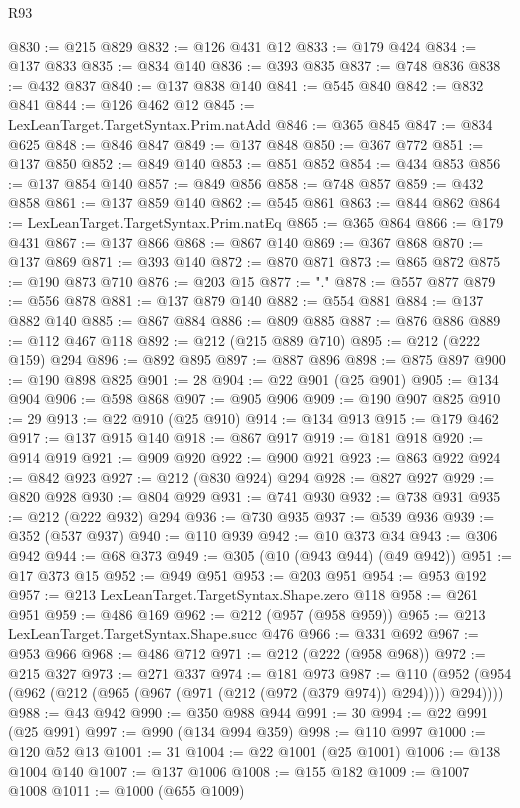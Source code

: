 \begin{lexlean}{R93}
\begin{coremodule}
@830 := @215 @829
@832 := @126 @431 @12
@833 := @179 @424
@834 := @137 @833
@835 := @834 @140
@836 := @393 @835
@837 := @748 @836
@838 := @432 @837
@840 := @137 @838 @140
@841 := @545 @840
@842 := @832 @841
@844 := @126 @462 @12
@845 := LexLeanTarget.TargetSyntax.Prim.natAdd
@846 := @365 @845
@847 := @834 @625
@848 := @846 @847
@849 := @137 @848
@850 := @367 @772
@851 := @137 @850
@852 := @849 @140
@853 := @851 @852
@854 := @434 @853
@856 := @137 @854 @140
@857 := @849 @856
@858 := @748 @857
@859 := @432 @858
@861 := @137 @859 @140
@862 := @545 @861
@863 := @844 @862
@864 := LexLeanTarget.TargetSyntax.Prim.natEq
@865 := @365 @864
@866 := @179 @431
@867 := @137 @866
@868 := @867 @140
@869 := @367 @868
@870 := @137 @869
@871 := @393 @140
@872 := @870 @871
@873 := @865 @872
@875 := @190 @873 @710
@876 := @203 @15
@877 := "."
@878 := @557 @877
@879 := @556 @878
@881 := @137 @879 @140
@882 := @554 @881
@884 := @137 @882 @140
@885 := @867 @884
@886 := @809 @885
@887 := @876 @886
@889 := @112 @467 @118
@892 := @212 (@215 @889 @710)
@895 := @212 (@222 @159) @294
@896 := @892 @895
@897 := @887 @896
@898 := @875 @897
@900 := @190 @898 @825
@901 := 28
@904 := @22 @901 (@25 @901)
@905 := @134 @904
@906 := @598 @868
@907 := @905 @906
@909 := @190 @907 @825
@910 := 29
@913 := @22 @910 (@25 @910)
@914 := @134 @913
@915 := @179 @462
@917 := @137 @915 @140
@918 := @867 @917
@919 := @181 @918
@920 := @914 @919
@921 := @909 @920
@922 := @900 @921
@923 := @863 @922
@924 := @842 @923
@927 := @212 (@830 @924) @294
@928 := @827 @927
@929 := @820 @928
@930 := @804 @929
@931 := @741 @930
@932 := @738 @931
@935 := @212 (@222 @932) @294
@936 := @730 @935
@937 := @539 @936
@939 := @352 (@537 @937)
@940 := @110 @939
@942 := @10 @373 @34
@943 := @306 @942
@944 := @68 @373
@949 := @305 (@10 (@943 @944) (@49 @942))
@951 := @17 @373 @15
@952 := @949 @951
@953 := @203 @951
@954 := @953 @192
@957 := @213 LexLeanTarget.TargetSyntax.Shape.zero @118
@958 := @261 @951
@959 := @486 @169
@962 := @212 (@957 (@958 @959))
@965 := @213 LexLeanTarget.TargetSyntax.Shape.succ @476
@966 := @331 @692
@967 := @953 @966
@968 := @486 @712
@971 := @212 (@222 (@958 @968))
@972 := @215 @327
@973 := @271 @337
@974 := @181 @973
@987 := @110 (@952 (@954 (@962 (@212 (@965 (@967 (@971 (@212 (@972 (@379 @974)) @294)))) @294))))
@988 := @43 @942
@990 := @350 @988 @944
@991 := 30
@994 := @22 @991 (@25 @991)
@997 := @990 (@134 @994 @359)
@998 := @110 @997
@1000 := @120 @52 @13
@1001 := 31
@1004 := @22 @1001 (@25 @1001)
@1006 := @138 @1004 @140
@1007 := @137 @1006
@1008 := @155 @182
@1009 := @1007 @1008
@1011 := @1000 (@655 @1009)

\end{coremodule}
\end{lexlean}
